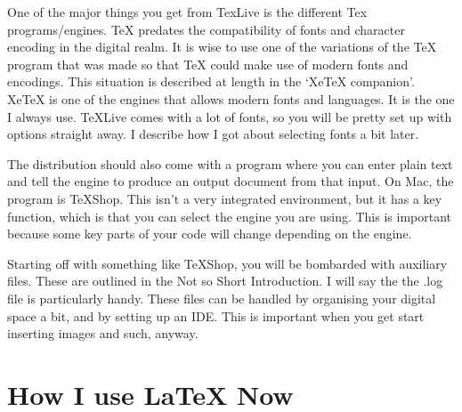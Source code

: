 \documentclass[12pt, oneside]{memoir}
\begin{document}
One of the major things you get from TexLive is the different Tex programs/engines. TeX predates the compatibility of fonts and character encoding in the digital realm. It is wise to use one of the variations of the TeX program that was made so that TeX could make use of modern fonts and encodings. This situation is described at length in the `XeTeX companion'. XeTeX is one of the engines that allows modern fonts and languages. It is the one I always use. TeXLive comes with a lot of fonts, so you will be pretty set up with options straight away. I describe how I got about selecting fonts a bit later.

The distribution should also come with a program where you can enter plain text and tell the engine to produce an output document from that input. On Mac, the program is TeXShop. This isn't a very integrated environment, but it has a key function, which is that you can select the engine you are using. This is important because some key parts of your code will change depending on the engine.

Starting off with something like TeXShop, you will be bombarded with auxiliary files. These are outlined in the Not so Short Introduction. I will say the the .log file is particularly handy. These files can be handled by organising your digital space a bit, and by setting up an IDE. This is important when you get start inserting images and such, anyway.

\section*{How I use LaTeX Now}




\end{document}
